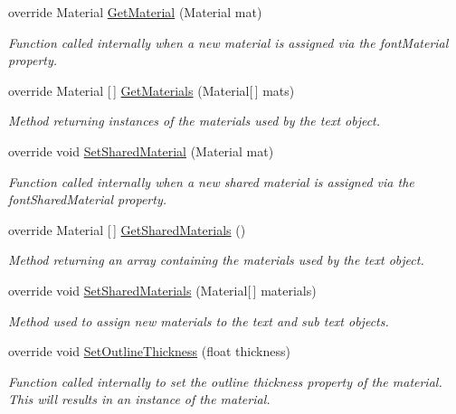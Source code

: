 \begin{DoxyCompactItemize}
override Material \mbox{\hyperlink{class_t_m_pro_1_1_text_mesh_pro_u_g_u_i_a51ff5f00ca136e0cb8c8865bb6e6ede9}{Get\+Material}} (Material mat)
\begin{DoxyCompactList}\small\item\em Function called internally when a new material is assigned via the font\+Material property. \end{DoxyCompactList}\item 
override Material \mbox{[}$\,$\mbox{]} \mbox{\hyperlink{class_t_m_pro_1_1_text_mesh_pro_u_g_u_i_a4502a341b8623af0a250ce549762fc28}{Get\+Materials}} (Material\mbox{[}$\,$\mbox{]} mats)
\begin{DoxyCompactList}\small\item\em Method returning instances of the materials used by the text object. \end{DoxyCompactList}\item 
override void \mbox{\hyperlink{class_t_m_pro_1_1_text_mesh_pro_u_g_u_i_a37642717b05a3ef8cb0eaa004b2f00bc}{Set\+Shared\+Material}} (Material mat)
\begin{DoxyCompactList}\small\item\em Function called internally when a new shared material is assigned via the font\+Shared\+Material property. \end{DoxyCompactList}\item 
override Material \mbox{[}$\,$\mbox{]} \mbox{\hyperlink{class_t_m_pro_1_1_text_mesh_pro_u_g_u_i_aba51a324293336a99b22e4ef5d380660}{Get\+Shared\+Materials}} ()
\begin{DoxyCompactList}\small\item\em Method returning an array containing the materials used by the text object. \end{DoxyCompactList}\item 
override void \mbox{\hyperlink{class_t_m_pro_1_1_text_mesh_pro_u_g_u_i_a9ca66d291221a6ee6a9aeaf7944a647d}{Set\+Shared\+Materials}} (Material\mbox{[}$\,$\mbox{]} materials)
\begin{DoxyCompactList}\small\item\em Method used to assign new materials to the text and sub text objects. \end{DoxyCompactList}\item 
override void \mbox{\hyperlink{class_t_m_pro_1_1_text_mesh_pro_u_g_u_i_a2f3dda7925344d1798b83d85e8c81361}{Set\+Outline\+Thickness}} (float thickness)
\begin{DoxyCompactList}\small\item\em Function called internally to set the outline thickness property of the material. This will results in an instance of the material. \end{DoxyCompactList}\item 

\end{DoxyCompactItemize}
